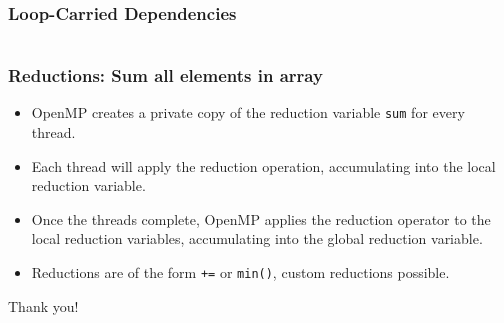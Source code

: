 \documentclass[]{beamer}
\begin{document}
\begin{frame}[fragile]
  \frametitle{Loop-Carried Dependencies}
  \begin{columns}[t]
    \begin{column}{0.55\textwidth}
    \end{column}
    \begin{column}{0.55\textwidth}
    \end{column}
  \end{columns}
\end{frame}


\begin{frame}[fragile]
  \frametitle{Reductions: Sum all elements in array}
  \begin{itemize}
  \item OpenMP creates a private copy of the reduction variable \texttt{sum} for every thread.
  \item Each thread will apply the reduction operation, accumulating into the local reduction variable.
  \item Once the threads complete, OpenMP applies the reduction operator to the local reduction variables, accumulating into the global reduction variable.
  \item Reductions are of the form \texttt{+=} or \texttt{min()}, custom reductions possible.
  \end{itemize}
\end{frame}

\begin{frame}[plain,c]
\begin{center}
    \huge Thank you!
\end{center}
\end{frame}
\end{document}
